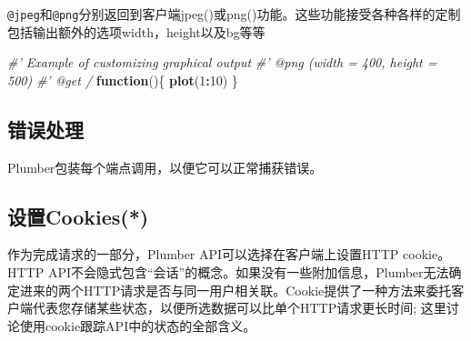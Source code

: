 \documentclass[]{book}
\newenvironment{Shaded}{\begin{snugshade}}{\end{snugshade}}
\newcommand{\KeywordTok}[1]{\textcolor[rgb]{0.13,0.29,0.53}{\textbf{#1}}}
\newcommand{\DataTypeTok}[1]{\textcolor[rgb]{0.13,0.29,0.53}{#1}}
\newcommand{\DecValTok}[1]{\textcolor[rgb]{0.00,0.00,0.81}{#1}}
\newcommand{\StringTok}[1]{\textcolor[rgb]{0.31,0.60,0.02}{#1}}
\newcommand{\CommentTok}[1]{\textcolor[rgb]{0.56,0.35,0.01}{\textit{#1}}}
\newcommand{\ControlFlowTok}[1]{\textcolor[rgb]{0.13,0.29,0.53}{\textbf{#1}}}
\newcommand{\OperatorTok}[1]{\textcolor[rgb]{0.81,0.36,0.00}{\textbf{#1}}}
\newcommand{\NormalTok}[1]{#1}
\begin{document}
\texttt{@jpeg}和\texttt{@png}分别返回到客户端jpeg()或png()功能。这些功能接受各种各样的定制包括输出额外的选项width，height以及bg等等

\begin{Shaded}
\begin{Highlighting}[]
\CommentTok{#' Example of customizing graphical output}
\CommentTok{#' @png (width = 400, height = 500)}
\CommentTok{#' @get /}
\ControlFlowTok{function}\NormalTok{()\{}
  \KeywordTok{plot}\NormalTok{(}\DecValTok{1}\OperatorTok{:}\DecValTok{10}\NormalTok{)}
\NormalTok{\}}
\end{Highlighting}
\end{Shaded}

\subsection{错误处理}

Plumber包装每个端点调用，以便它可以正常捕获错误。

\begin{Shaded}
\end{Shaded}

\subsection{设置Cookies(*)}\label{cookies}

作为完成请求的一部分，Plumber API可以选择在客户端上设置HTTP cookie。HTTP
API不会隐式包含``会话''的概念。如果没有一些附加信息，Plumber无法确定进来的两个HTTP请求是否与同一用户相关联。Cookie提供了一种方法来委托客户端代表您存储某些状态，以便所选数据可以比单个HTTP请求更长时间;
这里讨论使用cookie跟踪API中的状态的全部含义。
\end{document}
